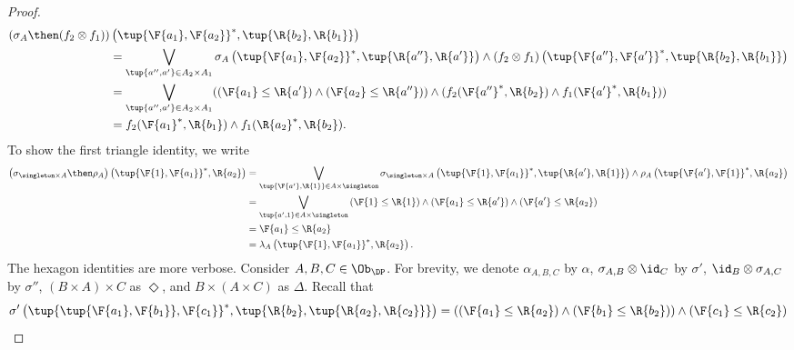 \begin{proof}
    \begin{equation}
        \begin{aligned}
           \left( \sigma_A \then (f_2\otimes f_1)\right)&\left( \tup{\F{a_1},\F{a_2}}^*,\tup{\R{b_2},\R{b_1}}\right)\\
           &=\bigvee_{\tup{a'',a'}\in A_2\times A_1}\sigma_A\left(\tup{\F{a_1},\F{a_2}}^*,\tup{\R{a''},\R{a'}} \right)\wedge \left(f_2\otimes f_1\right) \left( \tup{\F{a''},\F{a'}}^*,\tup{\R{b_2},\R{b_1}}\right)\\
           &=\bigvee_{\tup{a'',a'}\in A_2\times A_1}(\left(\F{a_1}\leq \R{a'}\right)\wedge \left(\F{a_2}\leq \R{a''}\right)) \wedge (f_2(\F{a''}^*,\R{b_2})\wedge f_1(\F{a'}^*,\R{b_1}))\\
           &= f_2(\F{a_1}^*,\R{b_1}) \wedge f_1(\R{a_2}^*,\R{b_2}).
        \end{aligned}
    \end{equation}
    To show the first triangle identity, we write
    \begin{equation}
        \begin{aligned}
           \left(\sigma_{\singleton \times A}\then \rho_A\right)\left( \tup{\F{1},\F{a_1}}^*,\R{a_2}\right)&=\bigvee_{\tup{\F{a'},\R{1}}\in A\times \singleton}\sigma_{\singleton \times A}\left( \tup{\F{1},\F{a_1}}^*,\tup{\R{a'},\R{1}}\right)\wedge \rho_A\left( \tup{\F{a'},\F{1}}^*,\R{a_2}\right)\\
           &=\bigvee_{\tup{a',1}\in A\times \singleton} \left(\F{1}\leq \R{1}\right) \wedge \left(\F{a_1}\leq \R{a'}\right)\wedge \left(\F{a'}\leq \R{a_2}\right)\\
           &=\F{a_1}\leq \R{a_2}\\
           &=\lambda_A\left( \tup{\F{1},\F{a_1}}^*,\R{a_2}\right).
        \end{aligned}
    \end{equation}
    The hexagon identities are more verbose. Consider $A,B,C\in \Ob_\DP$. For brevity, we denote $\alpha_{A,B,C}$ by $\alpha$, $\sigma_{A,B}\otimes \id_C$ by $\sigma'$, $\id_B \otimes \sigma_{A,C}$ by $\sigma''$, $(B\times A)\times C$ as $\Diamond$, and $B\times (A\times C)$ as $\Delta$. Recall that
    \begin{equation}
        \begin{aligned}
            \sigma' \left(\tup{\tup{\F{a_1},\F{b_1}},\F{c_1}}^*,\tup{\R{b_2},\tup{\R{a_2},\R{c_2}}} \right)&=\left( (\F{a_1}\leq \R{a_2})  \wedge (\F{b_1}\leq \R{b_2})\right)\wedge (\F{c_1}\leq \R{c_2})\\

\end{aligned}
\end{equation}
\end{proof}

